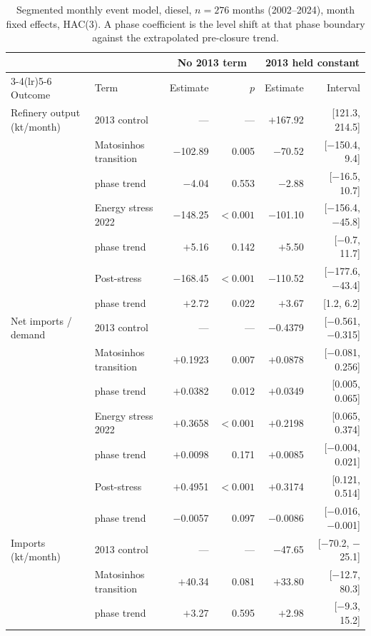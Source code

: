 \documentclass[11pt,a4paper]{article}
\begin{document}
\begin{table}[htbp]
\centering
\caption{Segmented monthly event model, diesel, $n=276$ months (2002--2024), month fixed
effects, HAC(3).
A phase coefficient is the level shift at that phase boundary against the extrapolated
pre-closure trend.}
\label{tab:monthly}
\small
\begin{tabular}{llrrrr}
\toprule
& & \multicolumn{2}{c}{No 2013 term} & \multicolumn{2}{c}{2013 held constant} \\
\cmidrule(lr){3-4}\cmidrule(lr){5-6}
Outcome & Term & Estimate & $p$ & Estimate & Interval \\
\midrule
Refinery output (kt/month) & 2013 control & --- & --- & $+$167.92 & [121.3, 214.5] \\
 & Matosinhos transition & $-$102.89 & 0.005 & $-$70.52 & [$-$150.4, 9.4] \\
 & \quad phase trend & $-$4.04 & 0.553 & $-$2.88 & [$-$16.5, 10.7] \\
 & Energy stress 2022 & $-$148.25 & $<0.001$ & $-$101.10 & [$-$156.4, $-$45.8] \\
 & \quad phase trend & $+$5.16 & 0.142 & $+$5.50 & [$-$0.7, 11.7] \\
 & Post-stress & $-$168.45 & $<0.001$ & $-$110.52 & [$-$177.6, $-$43.4] \\
 & \quad phase trend & $+$2.72 & 0.022 & $+$3.67 & [1.2, 6.2] \\
\midrule
Net imports / demand & 2013 control & --- & --- & $-$0.4379 & [$-$0.561, $-$0.315] \\
 & Matosinhos transition & $+$0.1923 & 0.007 & $+$0.0878 & [$-$0.081, 0.256] \\
 & \quad phase trend & $+$0.0382 & 0.012 & $+$0.0349 & [0.005, 0.065] \\
 & Energy stress 2022 & $+$0.3658 & $<0.001$ & $+$0.2198 & [0.065, 0.374] \\
 & \quad phase trend & $+$0.0098 & 0.171 & $+$0.0085 & [$-$0.004, 0.021] \\
 & Post-stress & $+$0.4951 & $<0.001$ & $+$0.3174 & [0.121, 0.514] \\
 & \quad phase trend & $-$0.0057 & 0.097 & $-$0.0086 & [$-$0.016, $-$0.001] \\
\midrule
Imports (kt/month) & 2013 control & --- & --- & $-$47.65 & [$-$70.2, $-$25.1] \\
 & Matosinhos transition & $+$40.34 & 0.081 & $+$33.80 & [$-$12.7, 80.3] \\
 & \quad phase trend & $+$3.27 & 0.595 & $+$2.98 & [$-$9.3, 15.2] \\

\end{tabular}
\end{table}
\end{document}
